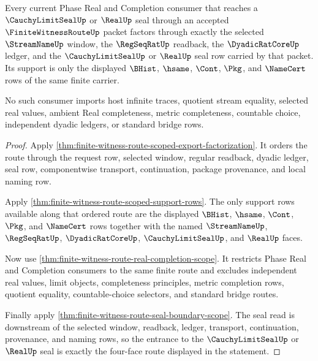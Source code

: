 \begin{theorem}
\label{thm:finite-witness-route-four-face-exit-exactness}
Every current Phase Real and Completion consumer that reaches a $\CauchyLimitSealUp$ or $\RealUp$ seal through an accepted $\FiniteWitnessRouteUp$ packet factors through exactly the selected $\StreamNameUp$ window, the $\RegSeqRatUp$ readback, the $\DyadicRatCoreUp$ ledger, and the $\CauchyLimitSealUp$ or $\RealUp$ seal row carried by that packet. Its support is only the displayed $\BHist$, $\hsame$, $\Cont$, $\Pkg$, and $\NameCert$ rows of the same finite carrier.

No such consumer imports host infinite traces, quotient stream equality, selected real values, ambient Real completeness, metric completeness, countable choice, independent dyadic ledgers, or standard bridge rows.
\end{theorem}
\begin{proof}
Apply \autoref{thm:finite-witness-route-scoped-export-factorization}. It orders the route through the request row, selected window, regular readback, dyadic ledger, seal row, componentwise transport, continuation, package provenance, and local naming row.

Apply \autoref{thm:finite-witness-route-scoped-support-rows}. The only support rows available along that ordered route are the displayed $\BHist$, $\hsame$, $\Cont$, $\Pkg$, and $\NameCert$ rows together with the named $\StreamNameUp$, $\RegSeqRatUp$, $\DyadicRatCoreUp$, $\CauchyLimitSealUp$, and $\RealUp$ faces.

Now use \autoref{thm:finite-witness-route-real-completion-scope}. It restricts Phase Real and Completion consumers to the same finite route and excludes independent real values, limit objects, completeness principles, metric completion rows, quotient equality, countable-choice selectors, and standard bridge routes.

Finally apply \autoref{thm:finite-witness-route-seal-boundary-scope}. The seal read is downstream of the selected window, readback, ledger, transport, continuation, provenance, and naming rows, so the entrance to the $\CauchyLimitSealUp$ or $\RealUp$ seal is exactly the four-face route displayed in the statement.
\end{proof}

